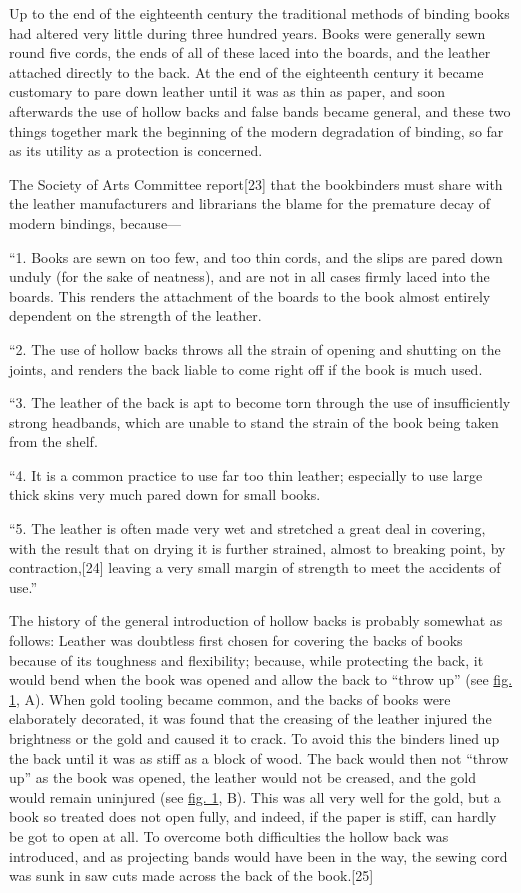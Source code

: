 \documentclass[
]{article}
\begin{document}
Up to the end of the eighteenth century the traditional methods of
binding books had altered very little during three hundred years. Books
were generally sewn round five cords, the ends of all of these laced
into the boards, and the leather attached directly to the back. At the
end of the eighteenth century it became customary to pare down leather
until it was as thin as paper, and soon afterwards the use of hollow
backs and false bands became general, and these two things together mark
the beginning of the modern degradation of binding, so far as its
utility as a protection is concerned.

The Society of Arts Committee
report{\protect\hypertarget{Page_23}{}{{[}23{]}}} that the bookbinders
must share with the leather manufacturers and librarians the blame for
the premature decay of modern bindings, because---

``1. Books are sewn on too few, and too thin cords, and the slips are
pared down unduly (for the sake of neatness), and are not in all cases
firmly laced into the boards. This renders the attachment of the boards
to the book almost entirely dependent on the strength of the leather.

``2. The use of hollow backs throws all the strain of opening and
shutting on the joints, and renders the back liable to come right off if
the book is much used.

``3. The leather of the back is apt to become torn through the use of
insufficiently strong headbands, which are unable to stand the strain of
the book being taken from the shelf.

``4. It is a common practice to use far too thin leather; especially to
use large thick skins very much pared down for small books.

``5. The leather is often made very wet and stretched a great deal in
covering, with the result that on drying it is further strained, almost
to breaking point, by
contraction,{\protect\hypertarget{Page_24}{}{{[}24{]}}} leaving a very
small margin of strength to meet the accidents of use.''

The history of the general introduction of hollow backs is probably
somewhat as follows: Leather was doubtless first chosen for covering the
backs of books because of its toughness and flexibility; because, while
protecting the back, it would bend when the book was opened and allow
the back to ``throw up'' (see \protect\hyperlink{Fig_1}{fig. 1}, A).
When gold tooling became common, and the backs of books were elaborately
decorated, it was found that the creasing of the leather injured the
brightness or the gold and caused it to crack. To avoid this the binders
lined up the back until it was as stiff as a block of wood. The back
would then not ``throw up'' as the book was opened, the leather would
not be creased, and the gold would remain uninjured (see
\protect\hyperlink{Fig_1}{fig. 1}, B). This was all very well for the
gold, but a book so treated does not open fully, and indeed, if the
paper is stiff, can hardly be got to open at all. To overcome both
difficulties the hollow back was introduced, and as projecting bands
would have been in the way, the sewing cord was sunk in saw cuts made
across the back of the book.{\protect\hypertarget{Page_25}{}{{[}25{]}}}
\end{document}
